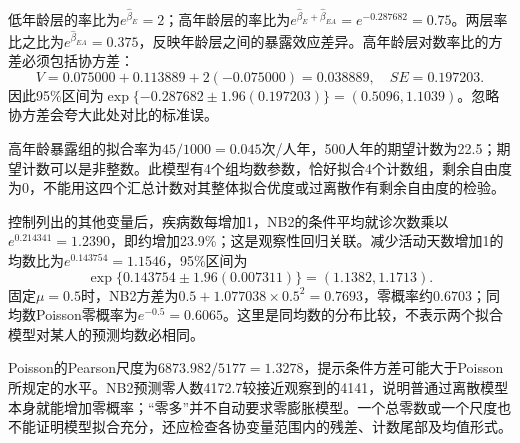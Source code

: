低年龄层的率比为$e^{\widehat\beta_E}=2$；高年龄层的率比为$e^{\widehat\beta_E+\widehat\beta_{EA}}=e^{-0.287682}=0.75$。两层率比之比为$e^{\widehat\beta_{EA}}=0.375$，反映年龄层之间的暴露效应差异。高年龄层对数率比的方差必须包括协方差：\[V=0.075000+0.113889+2(-0.075000)=0.038889,\quad SE=0.197203.\]因此95\%区间为$\exp\{-0.287682\pm1.96(0.197203)\}=(0.5096,1.1039)$。忽略协方差会夸大此处对比的标准误。\par 高年龄暴露组的拟合率为$45/1000=0.045$次/人年，500人年的期望计数为22.5；期望计数可以是非整数。此模型有4个组均数参数，恰好拟合4个计数组，剩余自由度为0，不能用这四个汇总计数对其整体拟合优度或过离散作有剩余自由度的检验。
\par\nobreak\smallskip{}

控制列出的其他变量后，疾病数每增加1，NB2的条件平均就诊次数乘以$e^{0.214341}=1.2390$，即约增加23.9\%；这是观察性回归关联。减少活动天数增加1的均数比为$e^{0.143754}=1.1546$，95\%区间为\[\exp\{0.143754\pm1.96(0.007311)\}=(1.1382,1.1713).\]固定$\mu=0.5$时，NB2方差为$0.5+1.077038\times0.5^2=0.7693$，零概率约$0.6703$；同均数Poisson零概率为$e^{-0.5}=0.6065$。这里是同均数的分布比较，不表示两个拟合模型对某人的预测均数必相同。\par Poisson的Pearson尺度为$6873.982/5177=1.3278$，提示条件方差可能大于Poisson所规定的水平。NB2预测零人数4172.7较接近观察到的4141，说明普通过离散模型本身就能增加零概率；“零多”并不自动要求零膨胀模型。一个总零数或一个尺度也不能证明模型拟合充分，还应检查各协变量范围内的残差、计数尾部及均值形式。
\par\nobreak\smallskip{}

